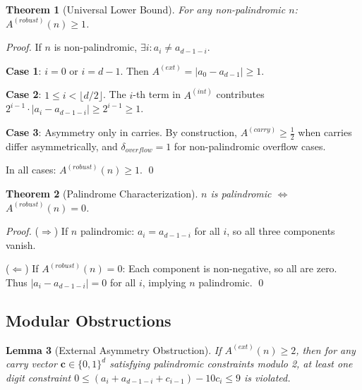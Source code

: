 \documentclass[12pt,a4paper]{article}
\newtheorem{theorem}{Theorem}[section]
\newtheorem{lemma}[theorem]{Lemma}
\begin{document}
\begin{theorem}[Universal Lower Bound]\label{thm:universal}
For any non-palindromic $n$: $A^{(robust)}(n) \geq 1$.
\end{theorem}

\begin{proof}
If $n$ is non-palindromic, $\exists i: a_i \neq a_{d-1-i}$.

\textbf{Case 1}: $i = 0$ or $i = d-1$. Then $A^{(ext)} = |a_0 - a_{d-1}| \geq 1$.

\textbf{Case 2}: $1 \leq i < \lfloor d/2 \rfloor$. The $i$-th term in $A^{(int)}$ contributes $2^{i-1} \cdot |a_i - a_{d-1-i}| \geq 2^{i-1} \geq 1$.

\textbf{Case 3}: Asymmetry only in carries. By construction, $A^{(carry)} \geq \frac{1}{2}$ when carries differ asymmetrically, and $\delta_{overflow} = 1$ for non-palindromic overflow cases.

In all cases: $A^{(robust)}(n) \geq 1$. \qed
\end{proof}

\begin{theorem}[Palindrome Characterization]\label{thm:pal_char}
$n$ is palindromic $\Leftrightarrow$ $A^{(robust)}(n) = 0$.
\end{theorem}

\begin{proof}
($\Rightarrow$) If $n$ palindromic: $a_i = a_{d-1-i}$ for all $i$, so all three components vanish.

($\Leftarrow$) If $A^{(robust)}(n) = 0$: Each component is non-negative, so all are zero. Thus $|a_i - a_{d-1-i}| = 0$ for all $i$, implying $n$ palindromic. \qed
\end{proof}

\subsection{Modular Obstructions}

\begin{lemma}[External Asymmetry Obstruction]\label{lem:ext_obst}
If $A^{(ext)}(n) \geq 2$, then for any carry vector $\mathbf{c} \in \{0,1\}^d$ satisfying palindromic constraints modulo 2, at least one digit constraint $0 \leq (a_i + a_{d-1-i} + c_{i-1}) - 10c_i \leq 9$ is violated.
\end{lemma}
\end{document}
